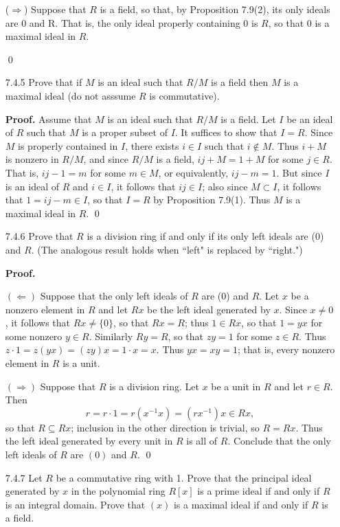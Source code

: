 \begin{enumerate}
      ($\Rightarrow$) Suppose that $R$ is a field, so that, by Proposition
      7.9(2), its only ideals are 0 and R. That is, the only ideal properly
      containing 0 is $R$, so that 0 is a maximal ideal in $R$.

      \qed
   \item[7.4.5]   Prove that if $M$ is an ideal such that $R/M$ is a field then
                  $M$ is a maximal ideal (do not asssume $R$ is commutative).

      \textbf{Proof.} Assume that $M$ is an ideal such that $R/M$ is a field.
      Let $I$ be an ideal of $R$ such that $M$ is a proper subset of $I$. It
      suffices to show that $I = R$. Since $M$ is properly contained in $I$,
      there exists $i \in I$ such that $i \notin M$. Thus $i + M$ is nonzero in
      $R/M$, and since $R/M$ is a field, $ij + M = 1 + M$ for some $j \in R$. 
      That is, $ij - 1 = m$ for some $m \in M$, or equivalently, $ij - m = 1$. 
      But since $I$ is an ideal of $R$ and $i \in I$, it follows that
      $ij \in I$; also since $M \subset I$, it follows that $1 = ij - m \in I$, 
      so that $I = R$ by Proposition 7.9(1). Thus $M$ is a maximal ideal in $R$. 
      \qed
   \item[7.4.6]   Prove that $R$ is a division ring if and only if its only left
                  ideals are (0) and $R$. (The analogous result holds when
                  ``left" is replaced by ``right.")

      \textbf{Proof.}

      $(\Leftarrow)$ Suppose that the only left ideals of $R$ are (0) and $R$.
      Let $x$ be a nonzero element in $R$ and let $Rx$ be the left ideal
      generated by $x$. Since $x \neq 0$, it follows that $Rx \neq \{0\}$, so
      that $Rx = R$; thus $1 \in Rx$, so that $1 = yx$ for some nonzero
      $y \in R$. Similarly $Ry = R$, so that $zy = 1$ for some $z \in R$. Thus
      $z \cdot 1 = z(yx) = (zy)x = 1 \cdot x = x$. Thus $yx = xy = 1$; that is,
      every nonzero element in $R$ is a unit.

      $(\Rightarrow)$ Suppose that $R$ is a division ring. Let $x$ be a unit in
      $R$ and let $r \in R$. Then
      $$r = r \cdot 1 = r(x^{-1}x) = (rx^{-1})x \in Rx,$$
      so that $R \subseteq Rx$; inclusion in the other direction is trivial, so
      $R = Rx$. Thus the left ideal generated by every unit in $R$ is all of
      $R$. Conclude that the only left ideals of $R$ are $(0)$ and $R$. \qed
   \item[7.4.7]   Let $R$ be a commutative ring with 1. Prove that the principal
                  ideal generated by $x$ in the polynomial ring $R[x]$ is a
                  prime ideal if and only if $R$ is an integral domain. Prove
                  that $(x)$ is a maximal ideal if and only if $R$ is a field.


\end{enumerate}
